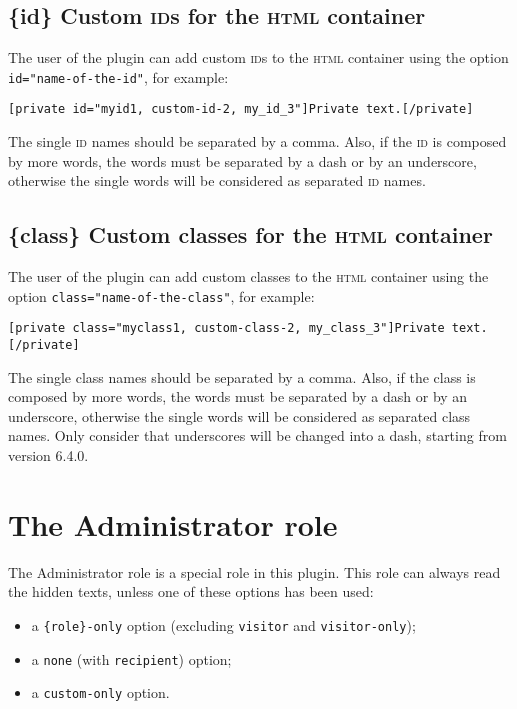 \section{\{id\} Custom \textsc{id}s for the \textsc{html} container}

The user of the plugin can add custom \textsc{id}s to the \textsc{html}
container using the option \verb+id="name-of-the-id"+, for example:

\begin{lstlisting}
[private id="myid1, custom-id-2, my_id_3"]Private text.[/private]
\end{lstlisting}

The single \textsc{id} names should be separated by a comma. Also, if the
\textsc{id} is composed by more words, the words must be separated by a dash or
by an underscore, otherwise the single words will be considered as separated
\textsc{id} names.

\section{\{class\} Custom classes for the \textsc{html} container}

The user of the plugin can add custom classes to the \textsc{html} container
using the option \verb+class="name-of-the-class"+, for example:

\begin{lstlisting}
[private class="myclass1, custom-class-2, my_class_3"]Private text.[/private]
\end{lstlisting}

The single class names should be separated by a comma. Also, if the class is
composed by more words, the words must be separated by a dash or by an
underscore, otherwise the single words will be considered as separated class
names. Only consider that underscores will be changed into a dash, starting from
version 6.4.0.

\chapter{The Administrator role}

\label{sec:admin-role}

The Administrator role is a special role in this plugin. This role can always
read the hidden texts, unless one of these options has been used:

\begin{itemize}
 \item a \verb+{role}-only+ option (excluding \verb+visitor+ and
 \verb+visitor-only+);
 \item a \verb+none+ (with \verb+recipient+) option;
 \item a \verb+custom-only+ option.
\end{itemize}

